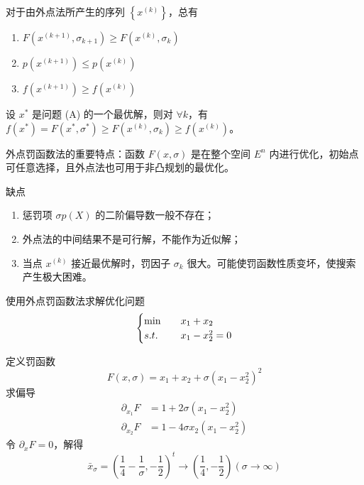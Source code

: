 \begin{theorem}
    对于由外点法所产生的序列 $\left\{x^{(k)}\right\}$，总有
    \begin{enumerate}
        \item $F\left(x^{(k + 1)}, \sigma_{k + 1}\right) \ge F\left(x^{(k)}, \sigma_k\right)$
        \item $p\left(x^{(k + 1)}\right) \le p\left(x^{(k)}\right)$
        \item $f\left(x^{(k + 1)}\right) \ge f\left(x^{(k)}\right)$
    \end{enumerate}
\end{theorem}

\begin{theorem}
    设 $x^*$ 是问题 (A) 的一个最优解，则对 $\forall k$，有$f(x^*) = F(x^*, \sigma^*) \ge F(x^{(k)}, \sigma_k) \ge f(x^{(k)})$。
\end{theorem}

\begin{note}
    外点罚函数法的重要特点：函数 $F(x, \sigma)$ 是在整个空间 $E^n$ 内进行优化，初始点可任意选择，且外点法也可用于非凸规划的最优化。

    缺点\begin{enumerate}
        \item 惩罚项 $\sigma p(X)$ 的二阶偏导数一般不存在；
        \item 外点法的中间结果不是可行解，不能作为近似解；
        \item 当点 $x^{(k)}$ 接近最优解时，罚因子 $\sigma_k$ 很大。可能使罚函数性质变坏，使搜索产生极大困难。
    \end{enumerate}
\end{note}

\begin{example}
    使用外点罚函数法求解优化问题
    \[
        \begin{cases}
            \min \quad &x_1 + x_2\\
            s.t. \quad &x_1 - x_2^2 = 0    
        \end{cases}
    \]

    \answer 
    定义罚函数
    \[
        F(x, \sigma) = x_1 + x_2 + \sigma(x_1 - x_2^2)^2
    \]
    求偏导 
    \begin{align*}
        \partial_{x_1}F &= 1 + 2\sigma(x_1 - x_2^2)\\
        \partial_{x_2}F &= 1 - 4\sigma x_2(x_1 - x_2^2)
    \end{align*}
    令 $\partial_{x}F = 0$，解得
    \[
        \bar{x}_\sigma = \left(\frac{1}{4} - \frac{1}{\sigma}, -\frac{1}{2}\right)^t \to \left(\frac{1}{4}, -\frac{1}{2}\right)(\sigma \to \infty)
    \]
\end{example}

